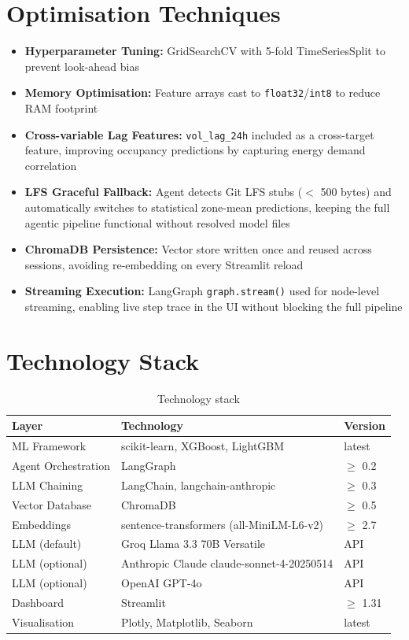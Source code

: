 \documentclass[12pt,a4paper]{article}
\begin{document}
\section{Optimisation Techniques}

\begin{itemize}[leftmargin=*]
  \item \textbf{Hyperparameter Tuning:} GridSearchCV with 5-fold TimeSeriesSplit
        to prevent look-ahead bias
  \item \textbf{Memory Optimisation:} Feature arrays cast to \texttt{float32}/\texttt{int8}
        to reduce RAM footprint
  \item \textbf{Cross-variable Lag Features:} \texttt{vol\_lag\_24h} included as a
        cross-target feature, improving occupancy predictions by capturing
        energy demand correlation
  \item \textbf{LFS Graceful Fallback:} Agent detects Git LFS stubs ($<$ 500 bytes)
        and automatically switches to statistical zone-mean predictions,
        keeping the full agentic pipeline functional without resolved model files
  \item \textbf{ChromaDB Persistence:} Vector store written once and reused across
        sessions, avoiding re-embedding on every Streamlit reload
  \item \textbf{Streaming Execution:} LangGraph \texttt{graph.stream()} used for
        node-level streaming, enabling live step trace in the UI without
        blocking the full pipeline
\end{itemize}

\section{Technology Stack}

\begin{table}[H]
\centering
\begin{tabular}{lll}
\toprule
\textbf{Layer} & \textbf{Technology} & \textbf{Version} \\
\midrule
ML Framework & scikit-learn, XGBoost, LightGBM & latest \\
Agent Orchestration & LangGraph & $\geq$ 0.2 \\
LLM Chaining & LangChain, langchain-anthropic & $\geq$ 0.3 \\
Vector Database & ChromaDB & $\geq$ 0.5 \\
Embeddings & sentence-transformers (all-MiniLM-L6-v2) & $\geq$ 2.7 \\
LLM (default) & Groq Llama 3.3 70B Versatile & API \\
LLM (optional) & Anthropic Claude claude-sonnet-4-20250514 & API \\
LLM (optional) & OpenAI GPT-4o & API \\
Dashboard & Streamlit & $\geq$ 1.31 \\
Visualisation & Plotly, Matplotlib, Seaborn & latest \\
\bottomrule
\end{tabular}
\caption{Technology stack}
\end{table}
\end{document}
